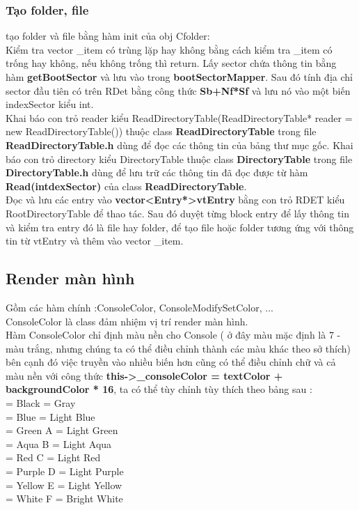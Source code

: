 \subsubsection{Tạo folder, file}
tạo folder và file bằng hàm init của obj Cfolder:\\
Kiểm tra vector \_item có trùng lặp hay không bằng cách kiểm tra \_item có trống hay không, nếu không trống thì return. Lấy sector chứa thông tin bằng hàm \textbf{getBootSector} và lưu vào trong \textbf{bootSectorMapper}. Sau đó tính địa chỉ sector đầu tiên có trên RDet bằng công thức \textbf{Sb+Nf*Sf} và lưu nó vào một biến indexSector kiểu int. \\
Khai báo con trỏ reader kiểu ReadDirectoryTable(ReadDirectoryTable* reader = new ReadDirectoryTable()) thuộc class \textbf{ReadDirectoryTable} trong file \textbf{ReadDirectoryTable.h} dùng để đọc các thông tin của bảng thư mục gốc. 	
Khai báo con trỏ directory kiểu DirectoryTable thuộc class \textbf{DirectoryTable} trong file \textbf{DirectoryTable.h} dùng để lưu trữ các thông tin đã đọc được từ hàm \textbf{Read(intdexSector)} của class \textbf{ReadDirectoryTable}.\\
 Đọc và lưu các entry vào \textbf{vector<Entry*>vtEntry} bằng con trỏ RDET kiểu RootDirectoryTable để thao tác. Sau đó duyệt từng block entry để lấy thông tin và kiểm tra entry đó là file hay folder, để tạo file hoặc folder tương ứng với thông tin từ vtEntry và thêm vào vector \_item. 
\subsection{Render màn hình}
Gồm các hàm chính :ConsoleColor, ConsoleModifySetColor, ...\\
ConsoleColor là class đảm nhiệm vị trí render màn hình.\\
Hàm ConsoleColor chỉ định màu nền cho Console ( ở đây màu mặc định là 7 - màu trắng, nhưng chúng ta có thể điều chỉnh thành các màu khác theo sở thích)\\
bên cạnh đó việc truyền vào nhiều biến hơn cũng có thể điều chỉnh chữ và cả màu nền
với công thức \textbf{this->\_consoleColor = textColor + backgroundColor * 16}, ta có thể tùy chỉnh tùy thích theo bảng sau :\\
\indent\indent{} = Black    = Gray\\\indent\indent{} = Blue    = Light Blue\\\indent\indent{} = Green    \quad   A = Light Green\\\indent\indent{} = Aqua     \quad   B = Light Aqua\\\indent\indent{} = Red       \quad  C = Light Red\\\indent\indent{} = Purple    \quad  D = Light Purple\\\indent\indent{} = Yellow    \quad  E = Light Yellow\\\indent\indent{} = White    \quad   F = Bright White\\
